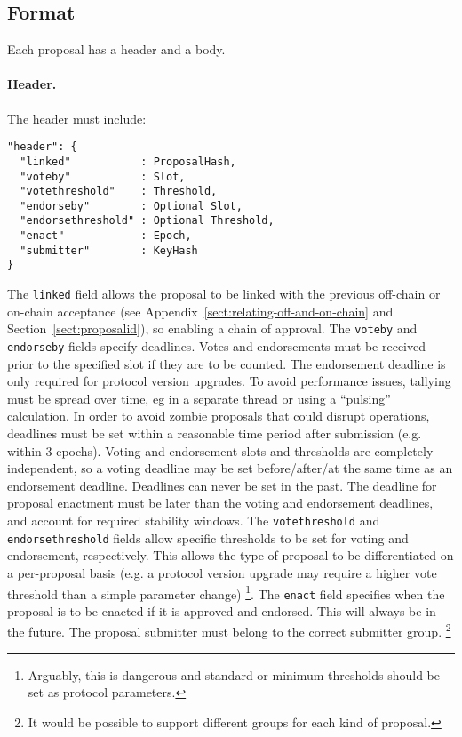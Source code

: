 \subsection{Format}

Each proposal has a header and a body.  %

\paragraph{Header.} The header must include:

\begin{verbatim}
"header": {
  "linked"           : ProposalHash,
  "voteby"           : Slot,
  "votethreshold"    : Threshold,
  "endorseby"        : Optional Slot,
  "endorsethreshold" : Optional Threshold,
  "enact"            : Epoch,
  "submitter"        : KeyHash
}
\end{verbatim}%

The \texttt{linked} field allows the proposal to be linked with the previous off-chain or on-chain acceptance (see Appendix~\ref{sect:relating-off-and-on-chain} and Section~\ref{sect:proposalid}), so enabling a chain of approval.  The \texttt{voteby} and \texttt{endorseby} fields specify deadlines.
Votes and endorsements must be received prior to the specified slot if they are to be counted.  The endorsement deadline is only required for protocol version upgrades.
To avoid performance issues, tallying must be spread over time, eg in a separate thread or using a ``pulsing'' calculation.
In order to avoid zombie proposals that could disrupt operations, deadlines must be set within a reasonable time period after submission (e.g. within 3 epochs).
Voting and endorsement slots and thresholds are completely independent, so a voting deadline may be set before/after/at the same time as an endorsement deadline.
Deadlines can never be set in the past.
The deadline for proposal enactment must be later than the  voting and endorsement deadlines, and account for required stability windows.
%
The \texttt{votethreshold} and \texttt{endorsethreshold} fields allow specific thresholds to be set for voting and endorsement, respectively.  This allows the type of proposal to be differentiated on a per-proposal basis
(e.g. a protocol version upgrade may require a higher vote threshold than a simple parameter change)
\footnote{Arguably, this is dangerous and standard or minimum thresholds should be set as protocol parameters.}.
%
The \texttt{enact} field specifies when the proposal is to be enacted if it is approved and endorsed.  This will always be in the future.
%
The proposal submitter must belong to the correct submitter group.  \footnote{It would be possible to support
  different groups for each kind of proposal.}

